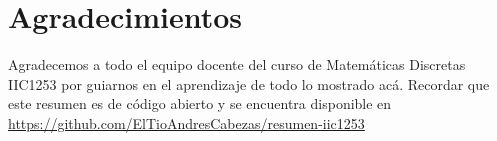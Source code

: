 \documentclass[../main.tex]{subfiles}
\begin{document}
\section{Agradecimientos}
Agradecemos a todo el equipo docente del curso de Matemáticas Discretas IIC1253 por guiarnos en el aprendizaje de todo lo mostrado acá. Recordar que este resumen es de código abierto y se encuentra disponible en \href{https://github.com/ElTioAndresCabezas/resumen-iic1253}{https://github.com/ElTioAndresCabezas/resumen-iic1253}
\end{document}
